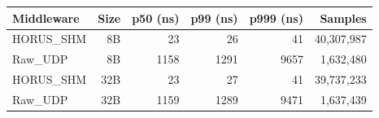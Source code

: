 \begin{tabular}{lrrrrr}
\toprule
Middleware & Size & p50 (ns) & p99 (ns) & p999 (ns) & Samples \\
\midrule
HORUS_SHM & 8B & 23 & 26 & 41 & 40,307,987 \\
Raw_UDP & 8B & 1158 & 1291 & 9657 & 1,632,480 \\
HORUS_SHM & 32B & 23 & 27 & 41 & 39,737,233 \\
Raw_UDP & 32B & 1159 & 1289 & 9471 & 1,637,439 \\
\bottomrule
\end{tabular}